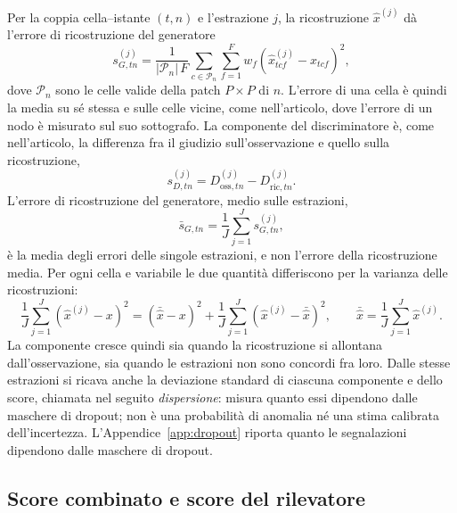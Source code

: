 Per la coppia cella--istante $(t,n)$ e l'estrazione $j$, la ricostruzione $\hat{x}^{(j)}$ dà l'errore di ricostruzione del generatore
\begin{equation}
s^{(j)}_{G,tn}=\frac{1}{|\mathcal{P}_n|\,F}\sum_{c\in \mathcal{P}_n}\sum_{f=1}^{F}w_f\left(\hat{x}^{(j)}_{tcf}-x_{tcf}\right)^{2},
\label{eq:componente-g}
\end{equation}
dove $\mathcal{P}_n$ sono le celle valide della patch $P\times P$ di $n$. L'errore di una cella è quindi la media su sé stessa e sulle celle vicine, come nell'articolo, dove l'errore di un nodo è misurato sul suo sottografo. La componente del discriminatore è, come nell'articolo, la differenza fra il giudizio sull'osservazione e quello sulla ricostruzione,
\begin{equation}
s^{(j)}_{D,tn}=D^{(j)}_{\mathrm{oss},tn}-D^{(j)}_{\mathrm{ric},tn}.
\end{equation}
L'errore di ricostruzione del generatore, medio sulle estrazioni,
\begin{equation}
\bar{s}_{G,tn}=\frac{1}{J}\sum_{j=1}^{J}s^{(j)}_{G,tn},
\label{eq:componente-g-media}
\end{equation}
è la media degli errori delle singole estrazioni, e non l'errore della ricostruzione media. Per ogni cella e variabile le due quantità differiscono per la varianza delle ricostruzioni:
\begin{equation}
\frac{1}{J}\sum_{j=1}^{J}\left(\hat{x}^{(j)}-x\right)^{2}
=\left(\bar{\hat{x}}-x\right)^{2}+\frac{1}{J}\sum_{j=1}^{J}\left(\hat{x}^{(j)}-\bar{\hat{x}}\right)^{2},
\qquad
\bar{\hat{x}}=\frac{1}{J}\sum_{j=1}^{J}\hat{x}^{(j)}.
\end{equation}
La componente cresce quindi sia quando la ricostruzione si allontana dall'osservazione, sia quando le estrazioni non sono concordi fra loro. Dalle stesse estrazioni si ricava anche la deviazione standard di ciascuna componente e dello score, chiamata nel seguito \emph{dispersione}: misura quanto essi dipendono dalle maschere di dropout; non è una probabilità di anomalia né una stima calibrata dell'incertezza. L'Appendice~\ref{app:dropout} riporta quanto le segnalazioni dipendono dalle maschere di dropout.

\subsection{Score combinato e score del rilevatore}

